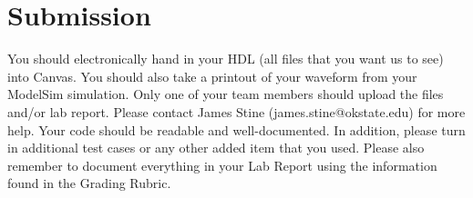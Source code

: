 \documentclass{article}
\begin{document}
\section{Submission}

You should electronically hand in your HDL (all files that you want
us to see) into Canvas.
You should also take a printout of your waveform 
from your ModelSim simulation.  
Only one of your team members should upload
the files and/or lab report. Please contact
James Stine
(james.stine@okstate.edu) 
for more help.  Your
code should be
readable and well-documented. In addition, please turn in additional
test cases or any other added item that you used. 
Please also remember to document everything in your Lab Report using
the information found in the Grading Rubric.


    


\end{document}
